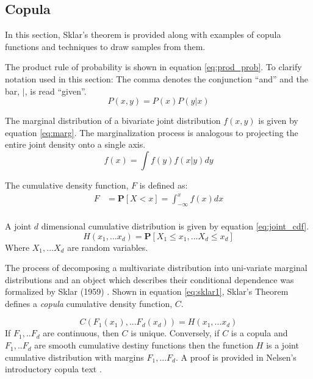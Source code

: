 
\subsection{Copula}

In this section, Sklar's theorem is provided along with examples of copula functions
and techniques to draw samples from them. 

The product rule of probability is shown in equation \ref{eq:prod_prob}.  To clarify notation used in this section: The comma denotes the conjunction ``and'' and the bar, $|$, is read ``given''.
\begin{equation}
P(x, y) = P(x) P(y | x)
\label{eq:prod_prob}
\end{equation}

The marginal distribution of a bivariate joint distribution $f(x, y)$ is given by equation \ref{eq:marg}.  The marginalization process is analogous to projecting the entire joint density onto a single axis.
\begin{equation}
f(x) = \int f(y) f(x|y) dy
\label{eq:marg}
\end{equation}

The cumulative density function, $F$ is defined as:
\begin{align*} 
F &= \mathbf{P}[X < x] = \int_{-\infty}^x f(x)dx \\
\end{align*}

A joint $d$ dimensional cumulative distribution is given by equation \ref{eq:joint_cdf}.
\begin{equation}
H(x_1, ... x_d) = \mathbf P[X_1 \leq x_1, ... X_d \leq x_d]
\label{eq:joint_cdf}
\end{equation}
Where $X_1, ... X_d$ are random variables.

The process of decomposing a multivariate distribution into uni-variate marginal
distributions and an object which describes their conditional dependence was
formalized by Sklar (1959) \cite{Sklar1959}.  Shown in equation \ref{eq:sklar1},  Sklar's Theorem
defines a \emph{copula} cumulative density function, $C$.

\begin{equation}
C(F_1(x_1), ... F_d(x_d)) = H(x_1, ... x_d)
\label{eq:sklar1}
\end{equation}
If $F_1, .. F_d$ are continuous, then $C$ is unique.  Conversely, if $C$ is a copula and $F_1, .. F_d$ are smooth cumulative destiny functions then the function $H$ is a joint cumulative distribution with margins $F_1, ... F_d$.  A proof is provided in Nelsen's introductory copula text \cite{Nelsen2006}.

